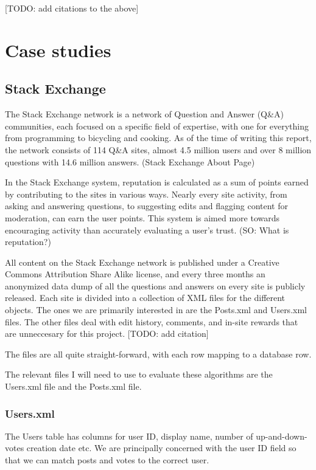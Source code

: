 \documentclass[]{final_report}
\begin{document}
[TODO: add citations to the above]

\section{Case studies}
\subsection{Stack Exchange}

The Stack Exchange network is a network of Question and Answer (Q\&A) communities, each focused on a specific field of expertise, with one for everything from programming to bicycling and cooking. As of the time of writing this report, the network consists of 114 Q\&A sites, almost 4.5 million users and over 8 million questions with 14.6 million answers. (Stack Exchange About Page)

In the Stack Exchange system, reputation is calculated as a sum of points earned by contributing to the sites in various ways. Nearly every site activity, from asking and answering questions, to suggesting edits and flagging content for moderation, can earn the user points. This system is aimed more towards encouraging activity than accurately evaluating a user's trust. (SO: What is reputation?)

All content on the Stack Exchange network is published under a Creative Commons Attribution Share Alike license, and 
every three months an anonymized data dump of all the questions and answers on every site is publicly released. Each site is divided into a collection of XML files for the different objects. The ones we are primarily interested in are the Posts.xml and Users.xml files. The other files deal with edit history, comments, and in-site rewards that are unneccesary for this project. [TODO: add citation]

The files are all quite straight-forward, with each row mapping to a database row.

The relevant files I will need to use to evaluate these algorithms are the Users.xml file and the Posts.xml file.

\subsubsection{Users.xml}
The Users table has columns for user ID, display name, number of up-and-down-votes creation date etc. We are principally concerned with the user ID field so that we can match posts and votes to the correct user.
\end{document}
